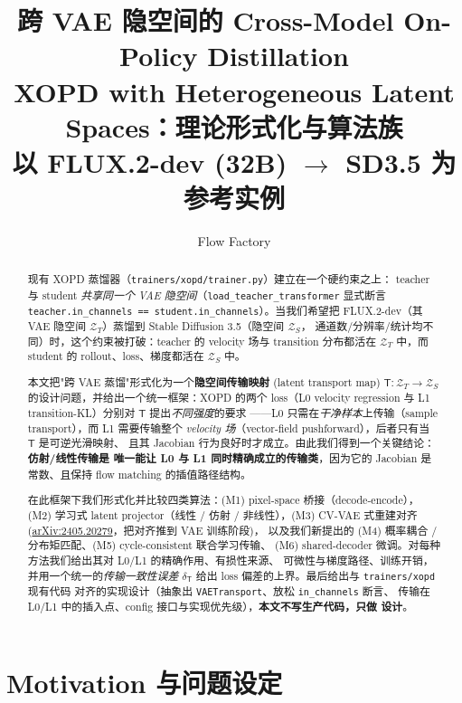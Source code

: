 \documentclass[11pt,a4paper]{article}
\title{\textbf{跨 VAE 隐空间的 Cross-Model On-Policy Distillation}\\[0.3em]
\large XOPD with Heterogeneous Latent Spaces：理论形式化与算法族\\[0.4em]
\large 以 FLUX.2-dev (32B) $\to$ SD3.5 为参考实例}
\author{Flow Factory}
\date{}
\newcommand{\Zt}{\mathcal{Z}_T}
\newcommand{\Zs}{\mathcal{Z}_S}
\newcommand{\Tmap}{\mathsf{T}}
\theoremstyle{definition}
\begin{document}
\maketitle

\begin{abstract}
现有 XOPD 蒸馏器（\texttt{trainers/xopd/trainer.py}）建立在一个硬约束之上：
teacher 与 student \emph{共享同一个 VAE 隐空间}（\texttt{load\_teacher\_transformer}
显式断言 \texttt{teacher.in\_channels == student.in\_channels}）。当我们希望把
FLUX.2-dev（其 VAE 隐空间 $\Zt$）蒸馏到 Stable Diffusion 3.5（隐空间 $\Zs$，
通道数/分辨率/统计均不同）时，这个约束被打破：teacher 的 velocity 场与 transition
分布都活在 $\Zt$ 中，而 student 的 rollout、loss、梯度都活在 $\Zs$ 中。

本文把"跨 VAE 蒸馏"形式化为一个\textbf{隐空间传输映射} (latent transport map)
$\Tmap:\Zt\to\Zs$ 的设计问题，并给出一个统一框架：XOPD 的两个 loss（L0
velocity regression 与 L1 transition-KL）分别对 $\Tmap$ 提出\emph{不同强度}的要求
——L0 只需在\emph{干净样本}上传输（sample transport），而 L1 需要传输整个
\emph{velocity 场}（vector-field pushforward），后者只有当 $\Tmap$ 是可逆光滑映射、
且其 Jacobian 行为良好时才成立。由此我们得到一个关键结论：\textbf{仿射/线性传输是
唯一能让 L0 与 L1 同时精确成立的传输类}，因为它的 Jacobian 是常数、且保持 flow
matching 的插值路径结构。

在此框架下我们形式化并比较四类算法：(M1) pixel-space 桥接（decode-encode），
(M2) 学习式 latent projector（线性 / 仿射 / 非线性），(M3) CV-VAE 式重建对齐
(\href{https://arxiv.org/abs/2405.20279}{arXiv:2405.20279}，把对齐推到 VAE 训练阶段)，
以及我们新提出的 (M4) 概率耦合 / 分布矩匹配、(M5) cycle-consistent 联合学习传输、
(M6) shared-decoder 微调。对每种方法我们给出其对 L0/L1 的精确作用、有损性来源、
可微性与梯度路径、训练开销，并用一个统一的\emph{传输一致性误差}
$\delta_{\Tmap}$ 给出 loss 偏差的上界。最后给出与 \texttt{trainers/xopd} 现有代码
对齐的实现设计（抽象出 \texttt{VAETransport}、放松 \texttt{in\_channels} 断言、
传输在 L0/L1 中的插入点、config 接口与实现优先级），\textbf{本文不写生产代码，只做
设计}。
\end{abstract}

\tableofcontents
\newpage

\section{Motivation 与问题设定}
\label{sec:motivation}
\end{document}
